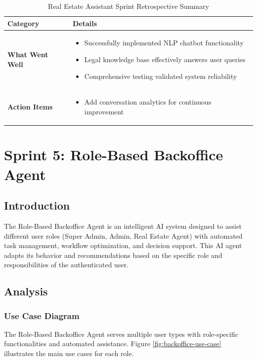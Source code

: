\begin{table}[htbp]
    \centering
    \begin{tabular}{|p{3cm}|p{10cm}|}
        \hline
        \textbf{Category} & \textbf{Details} \\
        \hline
        \textbf{What Went Well} & 
        \begin{itemize}
            \item Successfully implemented NLP chatbot functionality
            \item Legal knowledge base effectively answers user queries
            \item Comprehensive testing validated system reliability
        \end{itemize} \\
        \hline
        \textbf{Action Items} & 
        \begin{itemize}
            \item Add conversation analytics for continuous improvement
        \end{itemize} \\
        \hline
    \end{tabular}
    \caption{Real Estate Assistant Sprint Retrospective Summary}
    \label{tab:assistant-retrospective}
\end{table}

\newpage

\section{Sprint 5: Role-Based Backoffice Agent}
\subsection*{Introduction}
The Role-Based Backoffice Agent is an intelligent AI system designed to assist different user roles (Super Admin, Admin, Real Estate Agent) with automated task management, workflow optimization, and decision support. This AI agent adapts its behavior and recommendations based on the specific role and responsibilities of the authenticated user.

\subsection{Analysis}
\subsubsection{Use Case Diagram}
The Role-Based Backoffice Agent serves multiple user types with role-specific functionalities and automated assistance. Figure \ref{fig:backoffice-use-case} illustrates the main use cases for each role.

